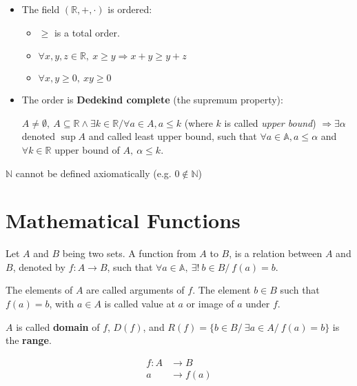 \documentclass[12pt, a4paper]{book}
\begin{document}
\begin{defn}
\begin{itemize}
    \item The field $(\mathbb{R},+,\cdot)$ is ordered:
    \begin{itemize}
      \item $\geq$ is a total order.
      \item $\forall x,y,z\in\mathbb{R}, \ x\geq y \Rightarrow x+y \geq y+z$
      \item $\forall x,y \geq 0, \ xy\geq 0$
    \end{itemize}

    \item The order is \textbf{Dedekind complete} (the supremum property):
    
    $A \neq \emptyset, \ A \subseteq \mathbb{R} \wedge \exists k\in\mathbb{R} / \forall a\in A, a\leq k$ (where $k$ is called \textit{upper bound}) $\Rightarrow \exists \alpha$ denoted $\sup A$ and called least upper bound, such that $\forall a\in\mathbb{A}, a\leq\alpha$ and $\forall k\in\mathbb{R}$ upper bound of $A,\ \alpha \leq k$.
  \end{itemize}
\end{defn}

\begin{rem}
  $\mathbb{N}$ cannot be defined axiomatically (e.g. $0\notin\mathbb{N}$)
\end{rem}


\section{Mathematical Functions}

\begin{defn}
  Let $A$ and $B$ being two sets. A function from $A$ to $B$, is a relation between $A$ and $B$, denoted by $f:A\rightarrow B$, such that $\forall a\in\mathbb{A}, \ \exists!\ b\in B / \ f(a) = b$.

  The elements of $A$ are called arguments of $f$. The element $b\in B$ such that $f(a) = b$, with $a \in A$ is called value at $a$ or image of $a$ under $f$.

  $A$ is called \textbf{domain} of $f$, $D(f)$, and $R(f) = \{b\in B/\ \exists a\in A /\ f(a)=b\}$ is the \textbf{range}.
\end{defn}

\begin{notation}
  \begin{align*}
    f:A &\longrightarrow B \\
    a &\longrightarrow f(a)
  \end{align*}
\end{notation}
\end{document}
